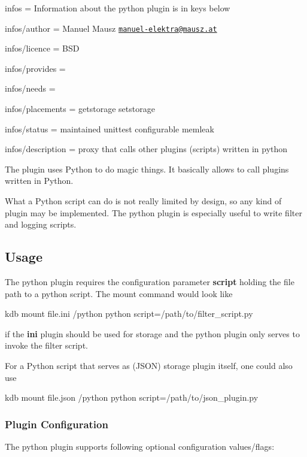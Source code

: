 
\begin{DoxyItemize}
\item infos = Information about the python plugin is in keys below
\item infos/author = Manuel Mausz \href{mailto:manuel-elektra@mausz.at}{\tt manuel-\/elektra@mausz.\+at}
\item infos/licence = B\+SD
\item infos/provides =
\item infos/needs =
\item infos/placements = getstorage setstorage
\item infos/status = maintained unittest configurable memleak
\item infos/description = proxy that calls other plugins (scripts) written in python
\end{DoxyItemize}

The plugin uses Python to do magic things. It basically allows to call plugins written in Python.

What a Python script can do is not really limited by design, so any kind of plugin may be implemented. The python plugin is especially useful to write filter and logging scripts.

\subsection*{Usage}

The python plugin requires the configuration parameter {\bfseries script} holding the file path to a python script. The mount command would look like \begin{DoxyVerb}kdb mount file.ini /python python script=/path/to/filter_script.py
\end{DoxyVerb}


if the {\bfseries ini} plugin should be used for storage and the python plugin only serves to invoke the filter script.

For a Python script that serves as (J\+S\+ON) storage plugin itself, one could also use \begin{DoxyVerb}kdb mount file.json /python python script=/path/to/json_plugin.py
\end{DoxyVerb}


\subsubsection*{Plugin Configuration}

The python plugin supports following optional configuration values/flags\+:


